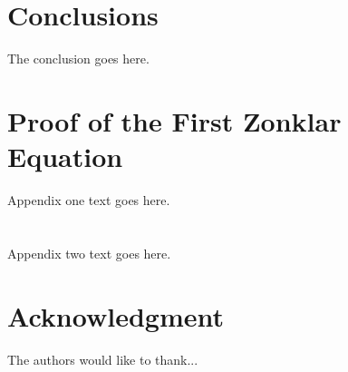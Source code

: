 \documentclass[journal]{IEEEtran}
\newcommand{\simo}[1]{{\color{red}#1}}
\begin{document}

\section{Conclusions}
The conclusion goes here.


%


\appendices
\section{Proof of the First Zonklar Equation}
Appendix one text goes here.

\section{}
Appendix two text goes here.


\section*{Acknowledgment}


The authors would like to thank...


\ifCLASSOPTIONcaptionsoff
  \newpage
\fi
\end{document}

